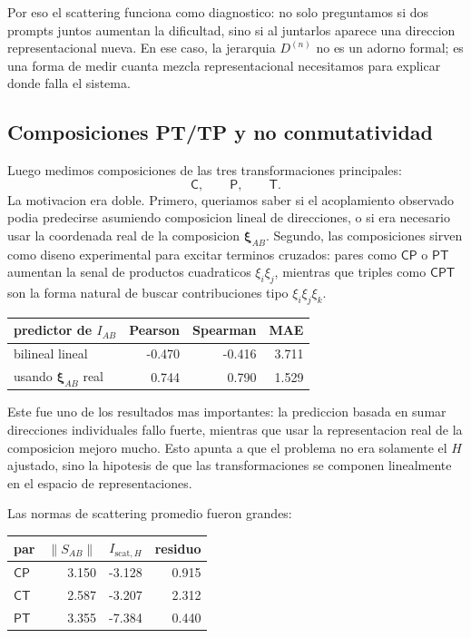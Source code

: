 ﻿\documentclass[10pt,twocolumn]{article}
\newcommand{\Ctrans}{\mathsf{C}}
\newcommand{\Ptrans}{\mathsf{P}}
\newcommand{\Ttrans}{\mathsf{T}}
\newcommand{\xrep}{\bm{\xi}}
\begin{document}
Por eso el scattering funciona como diagnostico: no solo preguntamos si dos prompts juntos aumentan la dificultad, sino si al juntarlos aparece una direccion representacional nueva. En ese caso, la jerarquia \(D^{(n)}\) no es un adorno formal; es una forma de medir cuanta mezcla representacional necesitamos para explicar donde falla el sistema.

\subsection{Composiciones PT/TP y no conmutatividad}

Luego medimos composiciones de las tres transformaciones principales:
\[
\Ctrans,\qquad \Ptrans,\qquad \Ttrans.
\]
La motivacion era doble. Primero, queriamos saber si el acoplamiento observado podia predecirse asumiendo composicion lineal de direcciones, o si era necesario usar la coordenada real de la composicion \(\xrep_{AB}\). Segundo, las composiciones sirven como diseno experimental para excitar terminos cruzados: pares como \(\Ctrans\Ptrans\) o \(\Ptrans\Ttrans\) aumentan la senal de productos cuadraticos \(\xi_i\xi_j\), mientras que triples como \(\Ctrans\Ptrans\Ttrans\) son la forma natural de buscar contribuciones tipo \(\xi_i\xi_j\xi_k\).

\begin{center}
\scriptsize
\begin{tabular}{@{}lrrr@{}}
\toprule
predictor de \(I_{AB}\) & Pearson & Spearman & MAE \\
\midrule
bilineal lineal & -0.470 & -0.416 & 3.711 \\
usando \(\xrep_{AB}\) real & 0.744 & 0.790 & 1.529 \\
\bottomrule
\end{tabular}
\end{center}

Este fue uno de los resultados mas importantes: la prediccion basada en sumar direcciones individuales fallo fuerte, mientras que usar la representacion real de la composicion mejoro mucho. Esto apunta a que el problema no era solamente el \(H\) ajustado, sino la hipotesis de que las transformaciones se componen linealmente en el espacio de representaciones.

Las normas de scattering promedio fueron grandes:

\begin{center}
\scriptsize
\begin{tabular}{@{}lrrr@{}}
\toprule
par & \(\|S_{AB}\|\) & \(I_{\mathrm{scat},H}\) & residuo \\
\midrule
\(\Ctrans\Ptrans\) & 3.150 & -3.128 & 0.915 \\
\(\Ctrans\Ttrans\) & 2.587 & -3.207 & 2.312 \\
\(\Ptrans\Ttrans\) & 3.355 & -7.384 & 0.440 \\
\bottomrule
\end{tabular}
\end{center}
\end{document}
